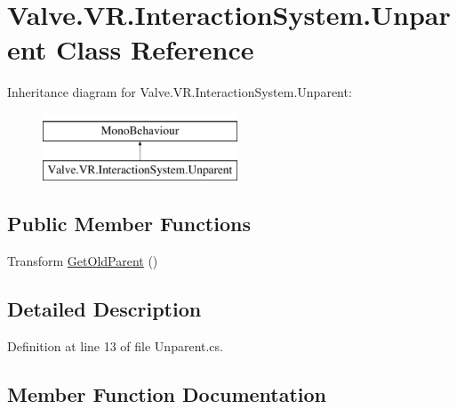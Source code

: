\hypertarget{class_valve_1_1_v_r_1_1_interaction_system_1_1_unparent}{}\section{Valve.\+V\+R.\+Interaction\+System.\+Unparent Class Reference}
\label{class_valve_1_1_v_r_1_1_interaction_system_1_1_unparent}
Inheritance diagram for Valve.\+V\+R.\+Interaction\+System.\+Unparent\+:\begin{figure}[H]
\begin{center}
\leavevmode
\includegraphics[height=2.000000cm]{class_valve_1_1_v_r_1_1_interaction_system_1_1_unparent}
\end{center}
\end{figure}
\subsection*{Public Member Functions}
\begin{DoxyCompactItemize}
\item 
Transform \mbox{\hyperlink{class_valve_1_1_v_r_1_1_interaction_system_1_1_unparent_a1b8a744a26af976adcaa30f92788fd07}{Get\+Old\+Parent}} ()
\end{DoxyCompactItemize}


\subsection{Detailed Description}


Definition at line 13 of file Unparent.\+cs.



\subsection{Member Function Documentation}
\mbox{\label{class_valve_1_1_v_r_1_1_interaction_system_1_1_unparent_a1b8a744a26af976adcaa30f92788fd07}} 
